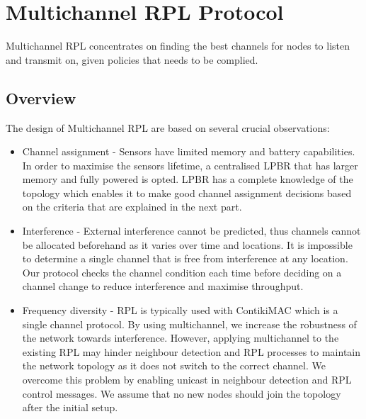 \section{Multichannel RPL Protocol}
\label{sec:multichannel}
Multichannel RPL concentrates on finding the best channels for nodes to listen and transmit on, given policies that needs to be complied. 

\subsection{Overview}


The design of Multichannel RPL are based on several crucial observations:

\begin{itemize}
\item Channel assignment - Sensors have limited memory and battery capabilities. In order to maximise the sensors lifetime, a centralised LPBR that has larger memory and fully powered is opted. LPBR has a complete knowledge of the topology which enables it to make good channel assignment decisions based on the criteria that are explained in the next part. 

\item Interference - External interference cannot be predicted, thus channels cannot be allocated beforehand as it varies over time and locations. It is impossible to determine a single channel that is free from interference at any location. Our protocol checks the channel condition each time before deciding on a channel change to reduce interference and maximise throughput.

\item Frequency diversity - RPL is typically used with ContikiMAC which is a single channel protocol. By using multichannel, we increase the robustness of the network towards interference. However, applying multichannel to the existing RPL may hinder neighbour detection and RPL processes to maintain the network topology as it does not switch to the correct channel. We overcome this problem by enabling unicast in neighbour detection and RPL control messages. We assume that no new nodes should join the topology after the initial setup.
\end{itemize}

